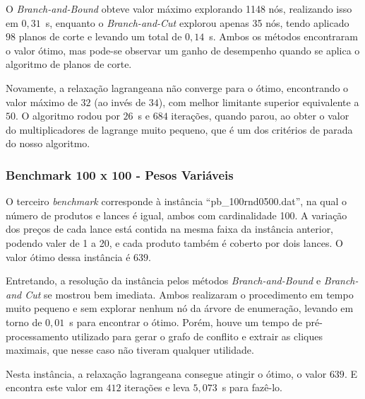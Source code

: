 \documentclass{article}
\begin{document}
    O \emph{Branch-and-Bound} obteve valor máximo explorando 1148 nós, realizando isso em $0{,}31$~s, enquanto o \emph{Branch-and-Cut} explorou apenas 35 nós, tendo aplicado $98$ planos de corte e levando um total de $0{,}14$~s. Ambos os métodos encontraram o valor ótimo, mas pode-se observar um ganho de desempenho quando se aplica o algoritmo de planos de corte.
    
    Novamente, a relaxação lagrangeana não converge para o ótimo, encontrando o valor máximo de $32$ (ao invés de $34$), com melhor limitante superior equivalente a $50$. O algoritmo rodou por $26$~s e $684$ iterações, quando parou, ao obter o valor do multiplicadores de lagrange muito pequeno, que é um dos critérios de parada do nosso algoritmo.
    
    
    \subsubsection{Benchmark 100 x 100 - Pesos Variáveis}
    O terceiro \emph{benchmark} corresponde à instância \enquote{pb\_100rnd0500.dat}, na qual o número de produtos e lances é igual, ambos com cardinalidade 100. A variação dos preços de cada lance está contida na mesma faixa da instância anterior, podendo valer de 1 a 20, e cada produto também é coberto por dois lances. O valor ótimo dessa instância é $639$.
    
    
    Entretando, a resolução da instância pelos métodos \emph{Branch-and-Bound} e \emph{Branch-and Cut} se mostrou bem imediata. Ambos realizaram o procedimento em tempo muito pequeno e sem explorar nenhum nó da árvore de enumeração, levando em torno de $ 0{,}01 $~s para encontrar o ótimo. Porém, houve um tempo de pré-processamento utilizado para gerar o grafo de conflito e extrair as cliques maximais, que nesse caso não tiveram qualquer utilidade.
    
    
    Nesta instância, a relaxação lagrangeana consegue atingir o ótimo, o valor $639$. E encontra este valor em $412$ iterações e leva $ 5{,}073 $~s para fazê-lo.
    
\end{document}
